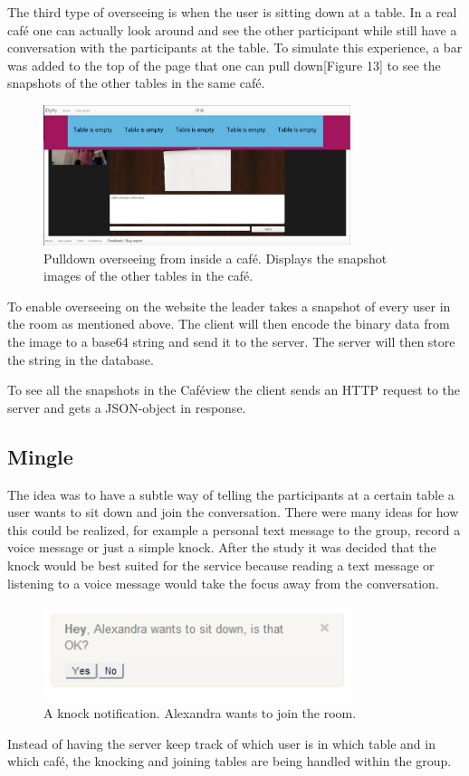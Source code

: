 \documentclass[12pt, titlepage]{article}
\begin{document}
The third type of overseeing is when the user is sitting down at a table. In a real café one can actually look around and see the other participant while still have a conversation with the participants at the table. To simulate this experience, a bar was added to the top of the page that one can pull down[Figure 13] to see the snapshots of the other tables in the same café.
\begin{figure}[H]
  \centering
	\includegraphics[width=0.8\textwidth,keepaspectratio]{pulldownoversee.jpg}
  \caption{Pulldown overseeing from inside a café. Displays the snapshot images of the other tables in the café.}
\end{figure}
To enable overseeing on the website the leader takes a snapshot of every user in the room as mentioned above. The client will then encode the binary data from the image to a base64 string and send it to the server. The server will then store the string in the database.

To see all the snapshots in the Caféview the client sends an HTTP request to the server and gets a JSON-object in response.
\subsection{Mingle}
The idea was to have a subtle way of telling the participants at a certain table a user wants to sit down and join the conversation. There were many ideas for how this could be realized, for example a personal text message to the group, record a voice message or just a simple knock. After the study it was decided that the knock would be best suited for the service because reading a text message or listening to a voice message would take the focus away from the conversation. 
\begin{figure}[H]
  \centering
	\includegraphics[width=0.8\textwidth,keepaspectratio]{knock.png}
  \caption{A knock notification. Alexandra wants to join the room.}
\end{figure}
Instead of having the server keep track of which user is in which table and in which café, the knocking and joining tables are being handled within the group.
\end{document}
